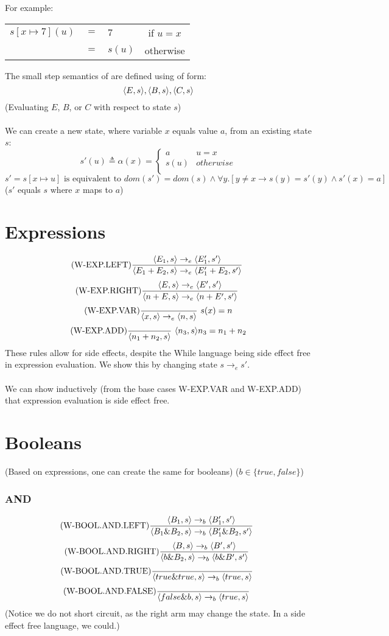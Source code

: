 \documentclass{report}
\begin{document}
For example:
\begin{center}
	\begin{tabular}{r c l c}
		$s[x \mapsto 7](u)$ & $=$ & $7$    & if $u = x$ \\
		                    & $=$ & $s(u)$ & otherwise  \\
	\end{tabular}
\end{center}
The small step semantics of  are defined using  of form:
\[\langle E, s \rangle, \langle B, s \rangle, \langle C, s \rangle \]
(Evaluating $E$, $B$, or $C$ with respect to state $s$)
\\
\\ We can create a new state, where variable $x$ equals value $a$, from an existing state $s$:
\[s'(u) \triangleq \alpha(x)=\begin{cases}
		a    & u = x     \\
		s(u) & otherwise \\
	\end{cases}\]
\[s' = s[x \mapsto u] \text{ is equivalent to } dom(s') = dom(s) \land \forall y.[y \neq x \rightarrow s(y) = s'(y) \land s'(x) = a]\]
($s'$ equals $s$ where $x$ maps to $a$)

\section*{Expressions}
\[\text{(W-EXP.LEFT)}\dfrac{\langle E_1, s \rangle \to_e \langle E'_1, s' \rangle}{\langle E_1 + E_2, s \rangle \to_e \langle E'_1 + E_2, s' \rangle} \ \]
\[\text{(W-EXP.RIGHT)}\dfrac{\langle E, s \rangle \to_e \langle E', s' \rangle}{\langle n+E, s \rangle \to_e \langle n + E', s' \rangle} \ \]
\[\text{(W-EXP.VAR)}\dfrac{}{\langle x, s \rangle \to_e \langle n, s \rangle} \ s(x) = n\]
\[\text{(W-EXP.ADD)}\dfrac{}{\langle n_1 + n_2, s \rangle} \ \langle n_3, s \rangle{n_3 = n_1 + n_2}\]
These rules allow for side effects, despite the While language being side effect free in expression evaluation. We show this by changing state $s \to_e s'$.
\\
\\ We can show inductively (from the base cases W-EXP.VAR and W-EXP.ADD) that expression evaluation is side effect free.
\section*{Booleans}
 (Based on expressions, one can create the same for booleans) ($b \in \{true, false\}$)
\subsubsection*{AND}
\[\text{(W-BOOL.AND.LEFT)}\dfrac{\langle B_1, s \rangle \to_b \langle B'_1, s' \rangle}{\langle B_1 \& B_2, s \rangle \to_b \langle B'_1 \& B_2, s' \rangle} \ \]
\[\text{(W-BOOL.AND.RIGHT)}\dfrac{\langle B, s \rangle \to_b \langle B', s' \rangle}{\langle b \& B_2, s \rangle \to_b \langle b \& B', s' \rangle} \ \]
\[\text{(W-BOOL.AND.TRUE)}\dfrac{}{\langle true \& true, s \rangle \to_b \langle true, s \rangle} \ \]
\[\text{(W-BOOL.AND.FALSE)}\dfrac{}{\langle false \& b, s \rangle \to_b \langle true, s \rangle} \ \]
(Notice we do not short circuit, as the right arm may change the state. In a side effect free language, we could.)
\end{document}
